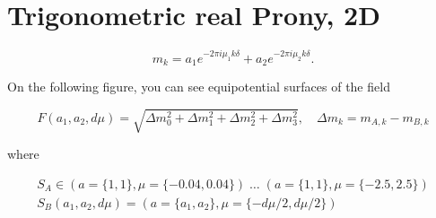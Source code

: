 \section{Trigonometric real Prony, 2D}

$$
m_k = a_1 e^{-2\pi i \mu_1 k \delta} + a_2 e^{-2\pi i \mu_2 k \delta}.
$$

On the following figure, you can see equipotential surfaces of the field

$$
F(a_1, a_2, d\mu) = \sqrt{\Delta m_0^2 + \Delta m_1^2 + \Delta m_2^2 + \Delta m_3^2}, \quad \Delta m_k = m_{A,k} - m_{B,k}
$$

where

$$
\begin{array}{l}
S_A \in (a = \{1, 1\}, \mu = \{-0.04, 0.04\}) \; \ldots \; (a = \{1, 1\}, \mu = \{-2.5, 2.5\}) \\
S_B(a_1, a_2, d\mu) = (a = \{a_1, a_2\}, \mu = \{ -d\mu/2, d\mu/2 \})
\end{array}
$$